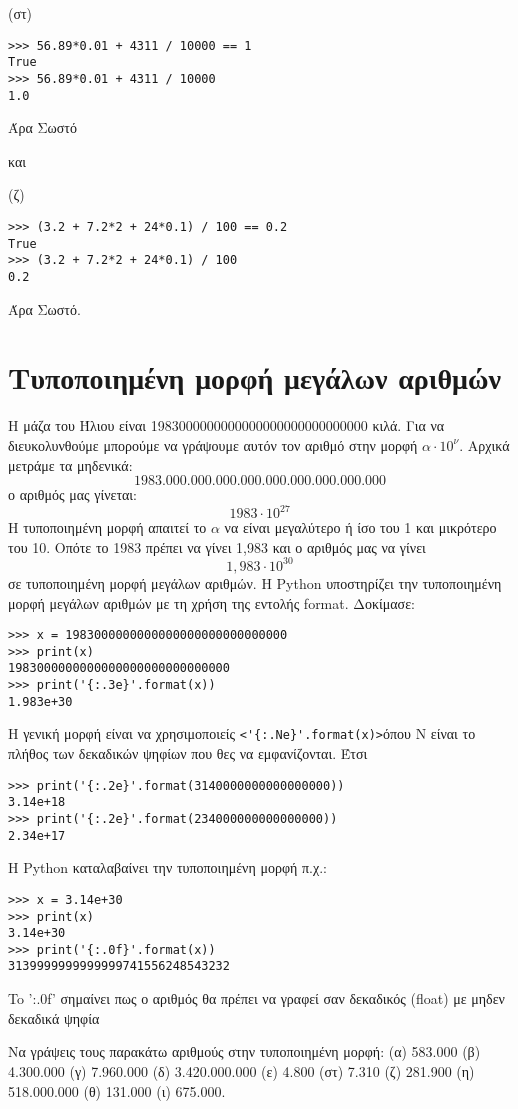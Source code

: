 (στ)
\begin{lstlisting}
>>> 56.89*0.01 + 4311 / 10000 == 1
True
>>> 56.89*0.01 + 4311 / 10000
1.0
\end{lstlisting}
Άρα Σωστό

και 

(ζ)
\begin{lstlisting}
>>> (3.2 + 7.2*2 + 24*0.1) / 100 == 0.2
True
>>> (3.2 + 7.2*2 + 24*0.1) / 100
0.2
\end{lstlisting}

Άρα Σωστό.


\section{Τυποποιημένη μορφή μεγάλων αριθμών}
Η μάζα του Ήλιου είναι 1983000000000000000000000000000 κιλά. Για να διευκολυνθούμε μπορούμε να γράψουμε αυτόν τον αριθμό στην μορφή $\alpha \cdot 10^ν$. Αρχικά μετράμε τα μηδενικά:
$$1983.000.000.000.000.000.000.000.000.000$$
ο αριθμός μας γίνεται:
$$1983\cdot 10^{27}$$
Η τυποποιημένη μορφή απαιτεί το $\alpha$ να είναι μεγαλύτερο ή ίσο του 1 και μικρότερο του 10. Οπότε το 1983 πρέπει να γίνει 1,983 και ο αριθμός μας να γίνει 
$$1,983\cdot 10^{30}$$
σε τυποποιημένη μορφή μεγάλων αριθμών.
Η Python υποστηρίζει την τυποποιημένη μορφή μεγάλων αριθμών με τη χρήση της εντολής format.
Δοκίμασε:
\begin{lstlisting}
>>> x = 1983000000000000000000000000000
>>> print(x)
1983000000000000000000000000000
>>> print('{:.3e}'.format(x))
1.983e+30
\end{lstlisting}
H γενική μορφή είναι να χρησιμοποιείς \lstinline|<'{:.Ne}'.format(x)>|όπου Ν είναι το πλήθος των δεκαδικών ψηφίων που θες να εμφανίζονται. Έτσι
\begin{lstlisting}
>>> print('{:.2e}'.format(3140000000000000000))
3.14e+18
>>> print('{:.2e}'.format(234000000000000000))
2.34e+17
\end{lstlisting}
Η Python καταλαβαίνει την τυποποιημένη μορφή π.χ.:
\begin{lstlisting}
>>> x = 3.14e+30
>>> print(x)
3.14e+30
>>> print('{:.0f}'.format(x))
3139999999999999741556248543232
\end{lstlisting}
To '{:.0f}' σημαίνει πως ο αριθμός θα πρέπει να γραφεί σαν δεκαδικός (float) με μηδεν δεκαδικά ψηφία
\begin{exercise}
Να γράψεις τους παρακάτω αριθμούς στην τυποποιημένη μορφή:
(α) 583.000 (β) 4.300.000 (γ) 7.960.000 (δ) 3.420.000.000 (ε) 4.800 (στ) 7.310
(ζ) 281.900 (η) 518.000.000 (θ) 131.000 (ι) 675.000.
\end{exercise}
